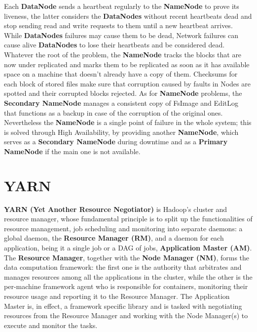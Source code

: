 Each \textbf{DataNode} sends a heartbeat regularly to the \textbf{NameNode} to prove its liveness, the latter considers the \textbf{DataNodes} without recent heartbeats dead and stop sending read and write requests to them until a new heartbeat arrives.\newline
While \textbf{DataNodes} failures may cause them to be dead, Network failures can cause alive \textbf{DataNodes} to lose their heartbeats and be considered dead.\newline
Whatever the root of the problem, the \textbf{NameNode} tracks the blocks that are now under replicated and marks them to be replicated as soon as it has available space on a machine that doesn't already have a copy of them.\newline
Checksums for each block of stored files make sure that corruption caused by faults in Nodes are spotted and their corrupted blocks rejected.\newline
As for \textbf{NameNode} problems, the \textbf{Secondary NameNode} manages a consistent copy of FsImage and EditLog that functions as a backup in case of the corruption of the original ones. Nevertheless the \textbf{NameNode} is a single point of failure in the whole system; this is solved through High Availability, by providing another \textbf{NameNode}, which serves as a \textbf{Secondary NameNode} during downtime and as a \textbf{Primary NameNode} if the main one is not available.

\pagebreak
\section{YARN} \label{YARN}

\textbf{YARN (Yet Another Resource Negotiator)} \cite{yarn_doc} is Hadoop's cluster and resource manager, whose fundamental principle is to split up the functionalities of resource management, job scheduling and monitoring into separate daemons: a global daemon, the \textbf{Resource Manager (RM)}, and a daemon for each application, being it a single job or a DAG of jobs, \textbf{Application Master (AM)}.
\newline\newline
The \textbf{Resource Manager}, together with the \textbf{Node Manager (NM)}, forms the data computation framework: the first one is the authority that arbitrates and manages resources among all the applications in the cluster, while the other is the per-machine framework agent who is responsible for containers, monitoring their resource usage and reporting it to the Resource Manager.
\newline\newline
The Application Master is, in effect, a framework specific library and is tasked with negotiating resources from the Resource Manager and working with the Node Manager(s) to execute and monitor the tasks.

